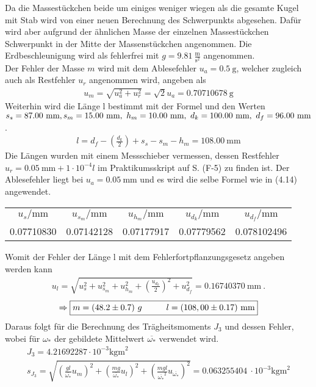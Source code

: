 Da die Massestückchen beide um einiges weniger wiegen als die gesamte Kugel mit Stab wird von einer neuen Berechnung des Schwerpunkts abgesehen. Dafür wird aber aufgrund der ähnlichen Masse der einzelnen Massestückchen Schwerpunkt in der Mitte der Massenstückchen angenommen. Die Erdbeschleunigung wird als fehlerfrei mit $g=9.81~\frac{\text{m}}{\text{s}^2}$ angenommen. \\
Der Fehler der Masse $m$ wird mit dem Ablesefehler $u_a=0.5~\text{g}$, welcher zugleich auch als Restfehler $u_r$ angenommen wird, angeben als
\begin{align}
    u_m=\sqrt{u_a^2+u_r^2}=\sqrt{2}u_a=0.70710678~\text{g}
\end{align}
Weiterhin wird die Länge l bestimmt mit der Formel und den Werten $s_s=87.00~\text{mm},~\\s_m=15.00~\text{mm},~h_m=10.00~\text{mm},~d_k=100.00~\text{mm},~d_f=96.00~\text{mm}$.
\begin{align}
    l = d_f - \left(\frac{d_k}{2}\right) + s_s - s_m - h_m=108.00~\text{mm} 
\end{align}
Die Längen wurden mit einem Messschieber vermessen, dessen Restfehler \\ $u_r=0.05~\text{mm}+1\cdot10^{-4}l$ im Praktikumsskript auf S. (F-5) zu finden ist. Der Ablesefehler liegt bei $u_a=0.05~\text{mm}$ und es wird die selbe Formel wie in (4.14) angewendet.
\begin{center}
    \begin{tabular}{ccccc}
        \rowcolor[rgb]{ .741,  .843,  .933}  $u_{s}/\text{mm} $ &  $u_{s_m}/\text{mm}$ &  $u_{h_m}/\text{mm}$ &  $u_{d_k}/\text{mm}$ &  $u_{d_f}/\text{mm}$\\
        0.07710830 & 0.07142128 & 0.07177917 & 0.07779562 & 0.078102496
    \end{tabular}
\end{center}
Womit der Fehler der Länge l mit dem Fehlerfortpflanzungsgesetz angeben werden kann
\begin{align}
    u_l=\sqrt{u_s^2+u_{s_m}^2+u_{h_m}^2+\left(\frac{u_{d_k}}{2}\right)^2+u_{d_f}^2}=0.16740370~\text{mm}~.
\end{align}
\begin{align*}
    \Rightarrow\boxed{m=(48.2\pm0.7)~g\tab l=(108,00\pm0.17)~\text{mm}}
\end{align*}
Daraus folgt für die Berechnung des Trägheitsmoments $J_3$ und dessen Fehler, wobei für $\omega_*$ der gebildete Mittelwert $\overline{\omega_*}$ verwendet wird. 
\begin{gather}
    J_3 = 4.21692287\cdot10^{-3}\text{kgm}^2 \\
    s_{J_3}=\sqrt{\left(\frac{gl}{\overline{\omega_*}}u_m\right)^2+\left(\frac{mg}{\overline{\omega_*}}u_l\right)^2+\left(\frac{mgl}{\overline{\omega_*}^2}u_{\overline{\omega_*}}\right)^2}=0.063255404~\cdot10^{-3}\text{kgm}^2
\end{gather}
